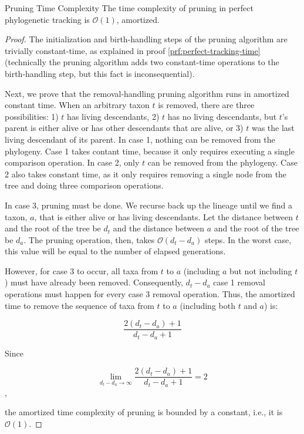 \begin{theorem}{Pruning Time Complexity}
\label{thm:perfect-tracking-with-pruning-time}
The time complexity of pruning in perfect phylogenetic tracking is $\mathcal{O}(1)$, amortized. 
\end{theorem}

\begin{proof}
\label{prf:perfect-tracking-with-pruning-time}
The initialization and birth-handling steps of the pruning algorithm are trivially constant-time, as explained in proof \ref{prf:perfect-tracking-time} (technically the pruning algorithm adds two constant-time operations to the birth-handling step, but this fact is inconsequential).

Next, we prove that the removal-handling pruning algorithm runs in amortized constant time.
When an arbitrary taxon $t$ is removed, there are three possibilities: 1) $t$ has living descendants, 2) $t$ has no living descendants, but $t$'s parent is either alive or has other descendants that are alive, or 3) $t$ was the last living descendant of its parent.
In case 1, nothing can be removed from the phylogeny.
Case 1 takes contant time, because it only requires executing a single comparison operation.
In case 2, only $t$ can be removed from the phylogeny.
Case 2 also takes constant time, as it only requires removing a single node from the tree and doing three comparison operations.

In case 3, pruning must be done.
We recurse back up the lineage until we find a taxon, $a$, that is either alive or has living descendants. 
Let the distance between $t$ and the root of the tree be $d_t$ and the distance between $a$ and the root of the tree be $d_a$.
The pruning operation, then, takes $\mathcal{O}(d_t - d_a)$ steps. 
In the worst case, this value will be equal to the number of elapsed generations.

However, for case 3 to occur, all taxa from $t$ to $a$ (including $a$ but not including $t$) must have already been removed.
Consequently, $d_t - d_a$ case 1 removal operations must happen for every case 3 removal operation.
Thus, the amortized time to remove the sequence of taxa from $t$ to $a$ (including both $t$ and $a$) is:

\[
\frac{2(d_t - d_a) + 1}{d_t - d_a + 1}
\]

Since

\[
\lim_{d_t - d_a\to\infty} \frac{2(d_t - d_a) + 1}{d_t - d_a + 1} = 2
\],

the amortized time complexity of pruning is bounded by a constant, i.e., it is $\mathcal{O}(1)$.


\end{proof}

